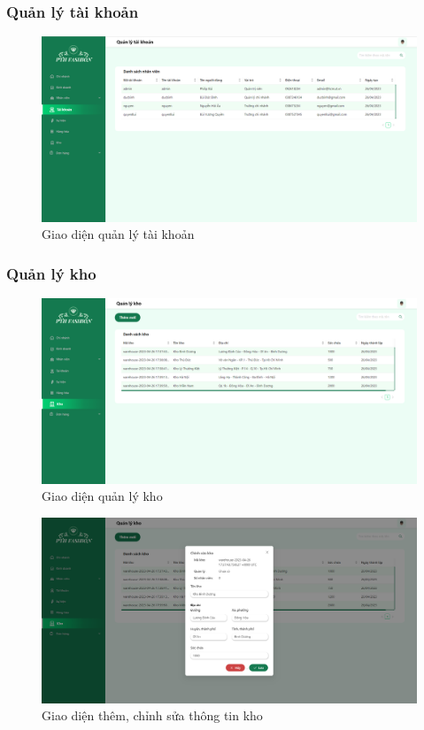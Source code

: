 \subsubsection{Quản lý tài khoản}
\begin{figure}[!htp]
    \centering
    \includegraphics[width=12cm]{img/UI/admin_implement/account.png}
    \newline
    \caption{Giao diện quản lý tài khoản}
\end{figure}


\subsubsection{Quản lý kho}
\begin{figure}[!htp]
    \centering
    \includegraphics[width=12cm]{img/UI/admin_implement/warehouse.png}
    \newline
    \caption{Giao diện quản lý kho}
\end{figure}


\newpage

\begin{figure}[!htp]
    \centering
    \includegraphics[width=12cm]{img/UI/admin_implement/warehouseEdit.png}
    \newline
    \caption{Giao diện thêm, chỉnh sửa thông tin kho}
\end{figure}





